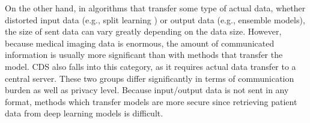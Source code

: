 








On the other hand, in algorithms that transfer some type of actual data, whether distorted input data  (e.g., split learning \cite{poirot2019split}) or output data (e.g., ensemble models), the size of sent data can vary greatly depending on the data size. However, because medical imaging data is enormous, the amount of communicated information is usually more significant than with methods that transfer the model. CDS also falls into this category, as it requires actual data transfer to a central server. These two groups differ significantly in terms of communication burden as well as privacy level. Because input/output data is not sent in any format, methods which transfer models are more secure since retrieving patient data from deep learning models is difficult.

